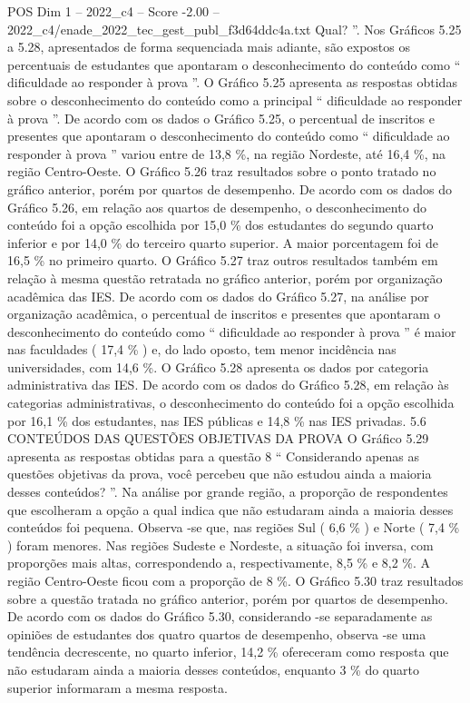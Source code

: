 \begin{textsample}{POS Dim 1 – 2022\_c4 – Score -2.00 – 2022\_c4/enade\_2022\_tec\_gest\_publ\_f3d64ddc4a.txt}
Qual? ”.
Nos Gráficos 5.25 a 5.28, apresentados de forma sequenciada mais adiante, são expostos os percentuais de estudantes que apontaram o desconhecimento do conteúdo como “ dificuldade ao responder à prova ”.
O Gráfico 5.25 apresenta as respostas obtidas sobre o desconhecimento do conteúdo como a principal “ dificuldade ao responder à prova ”.
De acordo com os dados o Gráfico 5.25, o percentual de inscritos e presentes que apontaram o desconhecimento do conteúdo como “ dificuldade ao responder à prova ” variou entre de 13,8 \%, na região Nordeste, até 16,4 \%, na região Centro-Oeste.
O Gráfico 5.26 traz resultados sobre o ponto tratado no gráfico anterior, porém por quartos de desempenho.
De acordo com os dados do Gráfico 5.26, em relação aos quartos de desempenho, o desconhecimento do conteúdo foi a opção escolhida por 15,0 \% dos estudantes do segundo quarto inferior e por 14,0 \% do terceiro quarto superior.
A maior porcentagem foi de 16,5 \% no primeiro quarto.
O Gráfico 5.27 traz outros resultados também em relação à mesma questão retratada no gráfico anterior, porém por organização acadêmica das IES.
De acordo com os dados do Gráfico 5.27, na análise por organização acadêmica, o percentual de inscritos e presentes que apontaram o desconhecimento do conteúdo como “ dificuldade ao responder à prova ” é maior nas faculdades ( 17,4 \% ) e, do lado oposto, tem menor incidência nas universidades, com 14,6 \%.
O Gráfico 5.28 apresenta os dados por categoria administrativa das IES.
De acordo com os dados do Gráfico 5.28, em relação às categorias administrativas, o desconhecimento do conteúdo foi a opção escolhida por 16,1 \% dos estudantes, nas IES públicas e 14,8 \% nas IES privadas. 5.6 CONTEÚDOS DAS QUESTÕES OBJETIVAS DA PROVA O Gráfico 5.29 apresenta as respostas obtidas para a questão 8 “ Considerando apenas as questões objetivas da prova, você percebeu que não estudou ainda a maioria desses conteúdos? ”.
Na análise por grande região, a proporção de respondentes que escolheram a opção a qual indica que não estudaram ainda a maioria desses conteúdos foi pequena.
Observa -se que, nas regiões Sul ( 6,6 \% ) e Norte ( 7,4 \% ) foram menores.
Nas regiões Sudeste e Nordeste, a situação foi inversa, com proporções mais altas, correspondendo a, respectivamente, 8,5 \% e 8,2 \%.
A região Centro-Oeste ficou com a proporção de 8 \%.
O Gráfico 5.30 traz resultados sobre a questão tratada no gráfico anterior, porém por quartos de desempenho.
De acordo com os dados do Gráfico 5.30, considerando -se separadamente as opiniões de estudantes dos quatro quartos de desempenho, observa -se uma tendência decrescente, no quarto inferior, 14,2 \% ofereceram como resposta que não estudaram ainda a maioria desses conteúdos, enquanto 3 \% do quarto superior informaram a mesma resposta.

\end{textsample}
